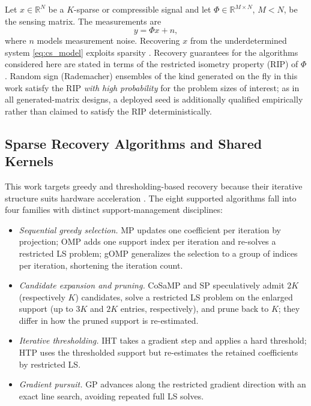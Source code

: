 Let $x \in \mathbb{R}^{N}$ be a $K$-sparse or compressible signal and let
$\Phi \in \mathbb{R}^{M \times N}$, $M < N$, be the sensing matrix. The
measurements are
\begin{equation}
  y = \Phi x + n,
  \label{eq:cs_model}
\end{equation}
where $n$ models measurement noise. Recovering $x$ from the underdetermined
system \eqref{eq:cs_model} exploits sparsity
\cite{donoho2006compressed, candes2008introduction}. Recovery guarantees for
the algorithms considered here are stated in terms of the restricted isometry
property (RIP) of $\Phi$. Random sign (Rademacher) ensembles of the kind
generated on the fly in this work satisfy the RIP \emph{with high
probability} for the problem sizes of interest; as in all
generated-matrix designs, a deployed seed is additionally qualified
empirically rather than claimed to satisfy the RIP deterministically.

\subsection{Sparse Recovery Algorithms and Shared Kernels}
\label{sec:background_algorithms}

This work targets greedy and thresholding-based recovery because their
iterative structure suits hardware acceleration \cite{marques2019review}.
The eight supported algorithms fall into four families with distinct
support-management disciplines:

\begin{itemize}
  \item \emph{Sequential greedy selection.} MP updates one coefficient per
  iteration by projection; OMP adds one support index per iteration and
  re-solves a restricted LS problem; gOMP generalizes the selection to a
  group of indices per iteration, shortening the iteration count.
  \item \emph{Candidate expansion and pruning.} CoSaMP and SP speculatively
  admit $2K$ (respectively $K$) candidates, solve a restricted LS problem on
  the enlarged support (up to $3K$ and $2K$ entries, respectively), and prune
  back to $K$; they differ in how the pruned support is re-estimated.
  \item \emph{Iterative thresholding.} IHT takes a gradient step and applies
  a hard threshold; HTP uses the thresholded support but re-estimates the
  retained coefficients by restricted LS.
  \item \emph{Gradient pursuit.} GP advances along the restricted gradient
  direction with an exact line search, avoiding repeated full LS solves.
\end{itemize}

